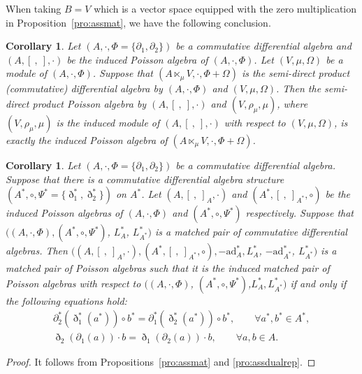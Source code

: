 \documentclass[10pt,a4paper]{amsart}
\numberwithin{equation}{section}
\newtheorem{Corollary}[Theorem]{Corollary}
\newcommand{\ad}{\mathrm{ad}}
\begin{document}
When taking $B = V$ which is a vector space equipped with the zero multiplication in Proposition~\ref{pro:assmat}, we have the following conclusion.
\begin{Corollary}\label{cor:asssemi}
 Let $(A, \cdot, \Phi = \{\partial_1, \partial_2\})$ be a commutative differential algebra and $(A, [\ ,\ ], \cdot)$ be the induced Poisson algebra of $(A, \cdot, \Phi)$.
 	Let $(V, \mu, \Omega)$ be a module of $(A, \cdot, \Phi)$.
 	Suppose that $(A \ltimes_\mu V, \cdot, \Phi + \Omega)$ is the semi-direct product (commutative) differential algebra by $(A, \cdot, \Phi)$ and $(V, \mu, \Omega)$.
 Then the semi-direct product Poisson algebra by $(A, [\ ,\ ], \cdot)$ and $(V, \rho_\mu, \mu)$,
 where $(V, \rho_\mu, \mu)$ is the induced module of $(A, [\ ,\ ], \cdot)$ with respect to $(V, \mu, \Omega)$,
 is exactly the induced Poisson algebra of $(A \ltimes_\mu V, \cdot, \Phi + \Omega)$.
\end{Corollary}

\begin{Corollary}\label{cor:adjassmat}
 Let $(A, \cdot, \Phi = \{\partial_1, \partial_2\})$ be a commutative differential algebra.
 Suppose that there is a commutative differential algebra structure $(A^*, \circ, \Psi^*= \{\eth_1^*,\eth_2^*\})$ on $A^*$.
 Let $(A, [\ ,\ ]_A, \cdot)$ and $(A^*, [\ ,\ ]_{A^*}, \circ)$ be the induced Poisson algebras of $(A, \cdot, \Phi)$ and $(A^*, \circ, \Psi^*)$ respectively.
 Suppose that $((A, \cdot, \Phi), (A^*, \circ, \Psi^*)$, $L_{A}^*$, $L_{A^*}^*)$ is a matched pair of commutative differential algebras.
 Then $((A, [\ ,\ ]_A, \cdot), (A^*, [\ ,\ ]_{A^*}, \circ), -\ad_A^*, L_A^*$, $-\ad_{A^*}^*$, $L_{A^*}^*)$ is a matched pair of Poisson algebras
 such that it is the induced matched pair of Poisson algebras with respect to
 $((A, \cdot, \Phi)$, $(A^*, \circ, \Psi^*)$,$L_{A}^*,L_{A^*}^*)$
 if and only if the following equations hold:
 \begin{gather}
 \partial_2^*(\eth_1^*(a^*)) \circ b^* = \partial_1^*(\eth_2^*(a^*)) \circ b^* , \qquad
 \forall a^*, b^* \in A^*, \label{eq:bvip2}\\
\eth_2(\partial_1(a)) \cdot b = \eth_1(\partial_2(a)) \cdot b , \qquad
 \forall a, b \in A. \label{eq:vip1}
 \end{gather}
\end{Corollary}
\begin{proof}
 It follows from Propositions~\ref{pro:assmat} and \ref{pro:assdualrep}.
\end{proof}
\end{document}
